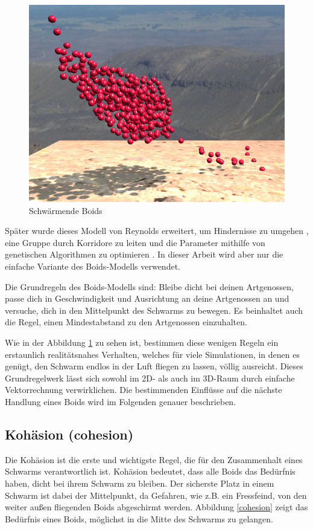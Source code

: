 \documentclass[draft=false
              ,paper=a4
              ,twoside=false
              ,fontsize=11pt
              ,headsepline
              ,BCOR10mm
              ,DIV11
              ,bibtotoc
              ,liststotoc
              ]{scrbook}
\begin{document}
\begin{figure}[!h]
\centering
\includegraphics[scale=0.4]{project/bigswarm.png}
\caption{Schwärmende Boids}
\label{simple}
\end{figure}

Später wurde dieses Modell von Reynolds erweitert, um Hindernisse zu umgehen \cite{alife92*327}, eine Gruppe durch Korridore zu leiten \cite{reynolds:1994:ecfbnw} und die Parameter mithilfe von genetischen Algorithmen zu optimieren \cite{sab92:reynolds}. In dieser Arbeit wird aber nur die einfache Variante des Boids-Modells verwendet.

Die Grundregeln des Boids-Modells sind: Bleibe dicht bei deinen Artgenossen, passe dich in Geschwindigkeit und Ausrichtung an deine Artgenossen an und versuche, dich in den Mittelpunkt des Schwarms zu bewegen.
Es beinhaltet auch die Regel, einen Mindestabstand zu den Artgenossen einzuhalten.

Wie in der Abbildung \ref{simple} zu sehen ist, bestimmen diese wenigen Regeln ein erstaunlich realitätsnahes Verhalten, welches für viele Simulationen, in denen es genügt, den Schwarm endlos in der Luft fliegen zu lassen, völlig ausreicht. Dieses Grundregelwerk lässt sich sowohl im 2D- als auch im 3D-Raum durch einfache Vektorrechnung verwirklichen. Die bestimmenden Einflüsse auf die nächste Handlung eines Boids wird im Folgenden genauer beschrieben.
\subsection{Kohäsion (cohesion)}
Die Kohäsion ist die erste und wichtigste Regel, die für den Zusammenhalt eines Schwarms verantwortlich ist. Kohäsion bedeutet, dass alle Boids das Bedürfnis haben, dicht bei ihrem Schwarm zu bleiben. Der sicherste Platz in einem Schwarm ist dabei der Mittelpunkt, da Gefahren, wie z.B. ein Fressfeind, von den weiter außen fliegenden Boids abgeschirmt werden. Abbildung \ref{cohesion} zeigt das Bedürfnis eines Boids, möglichst in die Mitte des Schwarms zu gelangen.
\end{document}
